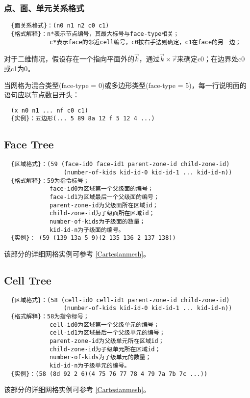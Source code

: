 \documentclass[lang=cn,11pt,a4paper]{elegantpaper} %
\begin{document}
\subsubsection{点、面、单元关系格式}
\begin{lstlisting}
  {面关系格式}：(n0 n1 n2 c0 c1)
  {格式解释}：n*表示节点编号，其最大标号与face-type相关；
             c*表示face的邻近cell编号，c0按右手法则确定，c1在face的另一边；
\end{lstlisting}

对于二维情况，假设存在一个指向平面外的$\overrightarrow{k}$，通过$\overrightarrow{k}\times\overrightarrow{r}$来确定c0；在边界处c0或c1为0。

当网格为混合类型(face-type = 0)或多边形类型(face-type = 5)，每一行说明面的语句应以节点数目开头：
\begin{lstlisting}
  (x n0 n1 ... nf c0 c1) 
  {实例}：五边形(... 5 89 8a 12 f 5 12 4 ...) 
\end{lstlisting}

\subsection{Face Tree}\label{Face-Tree}
\begin{lstlisting}
  {区域格式}：(59 (face-id0 face-id1 parent-zone-id child-zone-id)
                 (number-of-kids kid-id-0 kid-id-1 ... kid-id-n))
  {格式解释}：59为指令标号；
             face-id0为区域第一个父级面的编号；
             face-id1为区域最后一个父级面的编号；
             parent-zone-id为父级面所在区域id；
             child-zone-id为子级面所在区域id；
             number-of-kids为子级面的数量；
             kid-id-n为子级面的编号。
  {实例}： (59 (139 13a 5 9)(2 135 136 2 137 138))
\end{lstlisting}
该部分的详细网格实例可参考 \ref{Cartesianmesh}。

\subsection{Cell Tree}\label{Cell-Tree}
\begin{lstlisting}
  {区域格式}：(58 (cell-id0 cell-id1 parent-zone-id child-zone-id)
                 (number-of-kids kid-id-0 kid-id-1 ... kid-id-n))
  {格式解释}：58为指令标号；
             cell-id0为区域第一个父级单元的编号；
             cell-id1为区域最后一个父级单元的编号；
             parent-zone-id为父级单元所在区域id；
             child-zone-id为子级单元所在区域id；
             number-of-kids为子级单元的数量；
             kid-id-n为子级单元的编号。
  {实例}：(58 (8d 92 2 6)(4 75 76 77 78 4 79 7a 7b 7c ...))            
\end{lstlisting}
该部分的详细网格实例可参考 \ref{Cartesianmesh}。
\end{document}
